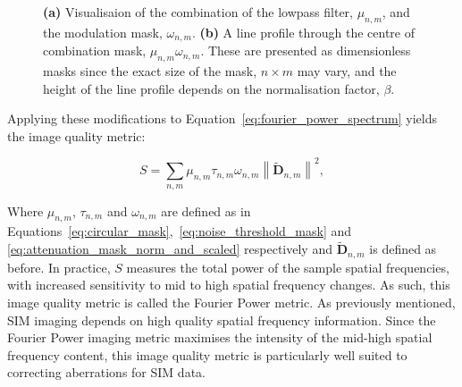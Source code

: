 \begin{figure}[h]
\begin{subfigure}{0.45\textwidth}
		\caption{}
		\label{fig:second_moment_combine_mask_cross_section}
	\end{subfigure}
	\caption[Visualisation of the modulation mask]{\textbf{(a)} Visualisaion of the combination of the lowpass filter, $\mu_{n,m}$, and the modulation mask, $\omega_{n,m}$. \textbf{(b)} A line profile through the centre of combination mask, $\mu_{n,m}\omega_{n,m}$. These are presented as dimensionless masks since the exact size of the mask, $n\times m$ may vary, and the height of the line profile depends on the normalisation factor, $\beta$.}
	\label{fig:modulation_mask_visualisation}
\end{figure}

Applying these modifications to Equation~\ref{eq:fourier_power_spectrum} 
yields the image quality metric:

\begin{equation}\label{eq:Fourier_power_metric}
S = \sum\limits_{n,m}{\mu_{n,m}\tau_{n,m}\omega_{n,m}\left\| \tilde{\textbf{D}}_{n,m} \right\|^2},
\end{equation}

Where $\mu_{n,m}$, $\tau_{n,m}$ and $\omega_{n,m}$ are defined as in
Equations~\ref{eq:circular_mask},~\ref{eq:noise_threshold_mask} and
\ref{eq:attenuation_mask_norm_and_scaled} respectively and 
$\tilde{\textbf{D}}_{n,m}$ is defined as before. In practice, $S$
measures the total power of the sample spatial frequencies, with 
increased sensitivity to mid to high spatial frequency changes. As
such, this image quality metric is called the Fourier Power metric.
As previously mentioned, SIM imaging depends on high quality spatial 
frequency information\cite{debarre2008adaptive,thomas2015enhanced}. 
Since the Fourier Power imaging metric maximises the intensity of 
the mid-high spatial frequency content, this image quality metric 
is particularly well suited to correcting aberrations for SIM data.
